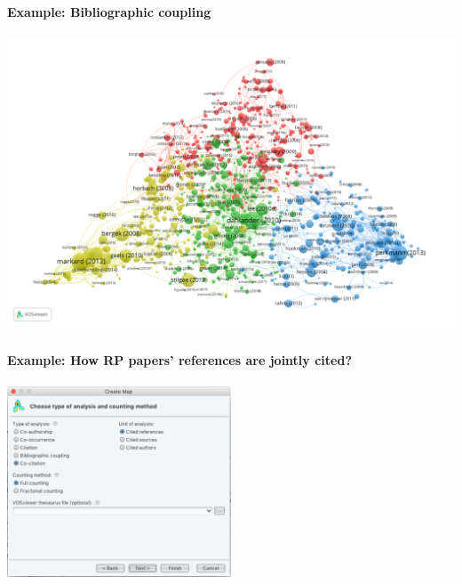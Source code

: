 \documentclass[8pt]{beamer}
\begin{document}
\begin{frame}
\frametitle{\insertsection}
\framesubtitle{Example: Bibliographic coupling}

\centering
\includegraphics[height = 0.8\textheight]{RP_20082018_bibcoupling}

\end{frame}


\begin{frame}
\frametitle{\insertsection}
\framesubtitle{Example: How RP papers' references are jointly cited?}

\centering
\includegraphics[width= 0.5\textwidth]{voscocitation_ref}

\end{frame}

\end{document}
